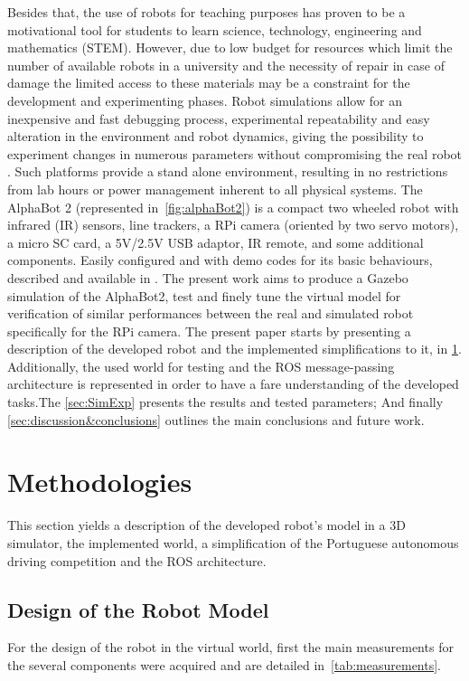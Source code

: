 \documentclass[conference]{IEEEtran}
\begin{document}
Besides that, the use of robots for teaching purposes has proven to be a motivational tool for students to learn science, technology, engineering and mathematics (STEM). However, due to low budget for resources which limit the number of available robots in a university and the necessity of repair in case of damage the limited access to these materials may be a constraint for the development and experimenting phases. Robot simulations allow for an inexpensive and fast debugging process, experimental repeatability and easy alteration in the environment and robot dynamics, giving the possibility to experiment changes in numerous parameters without compromising the real robot \cite{yusofDevelopmentEducationalVirtual2011}. Such platforms provide a stand alone environment, resulting in no restrictions from lab hours or power management inherent to all physical systems. 
The AlphaBot 2 (represented in~\cref{fig:alphaBot2}) is a compact two wheeled robot with infrared (IR) sensors, line trackers, a RPi camera (oriented by two servo motors), a micro SC card, a 5V/2.5V USB adaptor, IR remote, and some additional components. Easily configured and with demo codes for its basic behaviours, described and available in \cite{waveshare}.
The present work aims to produce a Gazebo simulation of the AlphaBot2, test and finely tune the virtual model for verification of similar performances between the real and simulated robot specifically for the RPi camera.
The present paper starts by presenting a description of the developed robot and the implemented simplifications to it, in \cref{sec:SystStruc}. Additionally, the used world for testing and the ROS message-passing architecture is represented in order to have a fare understanding of the developed tasks.The \cref{sec:SimExp} presents the results and tested parameters; And finally \cref{sec:discussion&conclusions} outlines the main conclusions and future work.

\section{Methodologies} \label{sec:SystStruc}
This section yields a description of the developed robot's model in a 3D simulator, the implemented world, a simplification of the Portuguese autonomous driving competition and the ROS architecture.

\subsection{Design of the Robot Model} \label{subsec:Model}
For the design of the robot in the virtual world, first the main measurements for the several components were acquired and are detailed in~\cref{tab:measurements}. 
\end{document}
